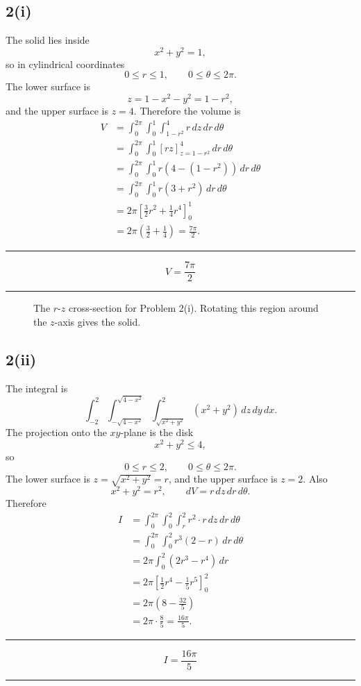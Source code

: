 \documentclass[11pt,a4paper]{article}
\newenvironment{resultbox}{\par\medskip\noindent\begin{minipage}{\linewidth}\hrule\smallskip}{\smallskip\hrule\end{minipage}\par\medskip}
\newcommand{\ans}[1]{\begin{resultbox}\[\boxed{#1}\]\end{resultbox}}
\begin{document}
\subsection*{2(i)}
The solid lies inside
\[
x^2+y^2=1,
\]
so in cylindrical coordinates
\[
0\le r\le1,
\qquad 0\le\theta\le2\pi.
\]
The lower surface is
\[
z=1-x^2-y^2=1-r^2,
\]
and the upper surface is \(z=4\). Therefore the volume is
\begin{align*}
V&=\int_0^{2\pi}\int_0^1\int_{1-r^2}^{4}r\,dz\,dr\,d\theta\\
&=\int_0^{2\pi}\int_0^1\left[rz\right]_{z=1-r^2}^{4}\,dr\,d\theta\\
&=\int_0^{2\pi}\int_0^1r(4-(1-r^2))\,dr\,d\theta\\
&=\int_0^{2\pi}\int_0^1r(3+r^2)\,dr\,d\theta\\
&=2\pi\left[\frac32r^2+\frac14r^4\right]_0^1\\
&=2\pi\left(\frac32+\frac14\right)=\frac{7\pi}{2}.
\end{align*}
\ans{V=\frac{7\pi}{2}}

\begin{figure}[H]
\centering
{}
\caption{The \(r\)-\(z\) cross-section for Problem 2(i). Rotating this region around the \(z\)-axis gives the solid.}
\end{figure}

\subsection*{2(ii)}
The integral is
\[
\int_{-2}^2\int_{-\sqrt{4-x^2}}^{\sqrt{4-x^2}}
\int_{\sqrt{x^2+y^2}}^2 (x^2+y^2)\,dz\,dy\,dx.
\]
The projection onto the \(xy\)-plane is the disk
\[
x^2+y^2\le4,
\]
so
\[
0\le r\le2,
\qquad 0\le\theta\le2\pi.
\]
The lower surface is \(z=\sqrt{x^2+y^2}=r\), and the upper surface is \(z=2\). Also
\[
x^2+y^2=r^2,
\qquad dV=r\,dz\,dr\,d\theta.
\]
Therefore
\begin{align*}
I&=\int_0^{2\pi}\int_0^2\int_r^2r^2\cdot r\,dz\,dr\,d\theta\\
&=\int_0^{2\pi}\int_0^2r^3(2-r)\,dr\,d\theta\\
&=2\pi\int_0^2(2r^3-r^4)\,dr\\
&=2\pi\left[\frac12r^4-\frac15r^5\right]_0^2\\
&=2\pi\left(8-\frac{32}{5}\right)\\
&=2\pi\cdot\frac85=\frac{16\pi}{5}.
\end{align*}
\ans{I=\frac{16\pi}{5}}
\end{document}
